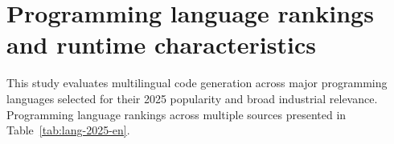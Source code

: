 \documentclass{article} %
\begin{document}

\section{Programming language rankings and runtime characteristics}
\label{app_rankings}

This study evaluates multilingual code generation across major programming languages selected for their 2025 popularity and broad industrial relevance. Programming language rankings across multiple sources presented in Table~\ref{tab:lang-2025-en}.
\end{document}

